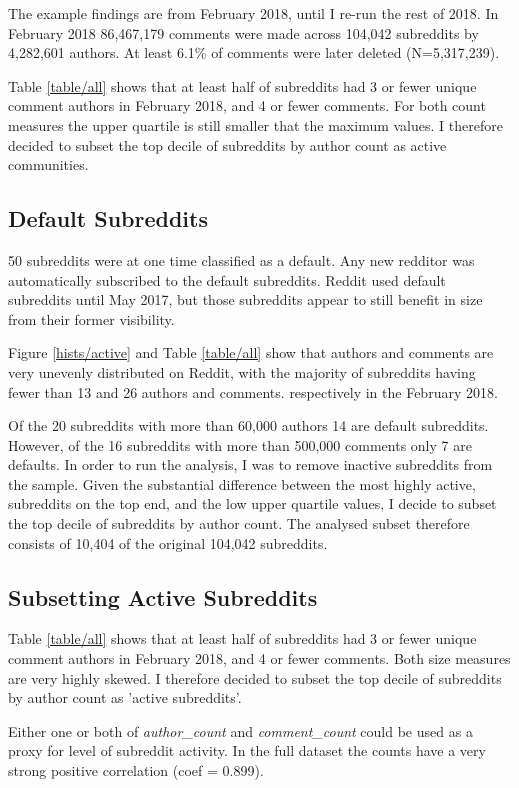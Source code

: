\documentclass{article}
\begin{document}
The example findings are from February 2018, until I re-run the rest of 2018. In February 2018 86,467,179 comments were made across 104,042 subreddits by 4,282,601 authors. At least 6.1\% of comments were later deleted (N=5,317,239).

Table \ref{table/all} shows that at least half of subreddits had 3 or fewer unique comment authors in February 2018, and 4 or fewer comments. For both count measures the upper quartile is still smaller that the maximum values. I therefore decided to subset the top decile of subreddits by author count as active communities.


\subsection{Default Subreddits}
50 subreddits were at one time classified as a default. Any new redditor was automatically subscribed to the default subreddits. Reddit used default subreddits until May 2017, but those subreddits appear to still benefit in size from their former visibility.

Figure \ref{hists/active} and Table \ref{table/all} show that authors and comments are very unevenly distributed on Reddit, with the majority of subreddits having fewer than 13 and 26 authors and comments. respectively in the February 2018.

Of the 20 subreddits with more than 60,000 authors 14 are default subreddits. However, of the 16 subreddits with more than 500,000 comments only 7 are defaults. In order to run the analysis, I was to remove inactive subreddits from the sample. Given the substantial difference between the most highly active, subreddits on the top end, and the low upper quartile values, I decide to subset the top decile of subreddits by author count. The analysed subset therefore consists of 10,404 of the original 104,042 subreddits.


\subsection{Subsetting Active Subreddits}
Table \ref{table/all} shows that at least half of subreddits had 3 or fewer unique comment authors in February 2018, and 4 or fewer comments. Both size measures are very highly skewed. I therefore decided to subset the top decile of subreddits by author count as 'active subreddits'.

Either one or both of \textit{author\_count} and \textit{comment\_count} could be used as a proxy for level of subreddit activity. In the full dataset the counts have a very strong positive correlation (coef = 0.899). 
\end{document}
